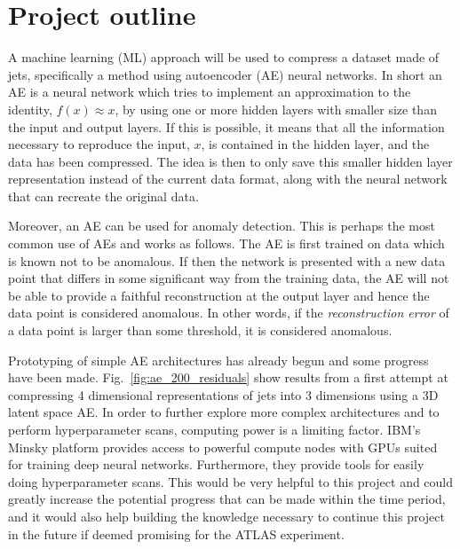 \documentclass[11pt]{article}
\begin{document}
\section{Project outline}

A machine learning (ML) approach will be used to compress a dataset made of jets, specifically a method using autoencoder (AE) neural networks. In short an AE is a neural network which tries to implement an approximation to the identity, $f(x) \approx x$, by using one or more hidden layers with smaller size than the input and output layers. If this is possible, it means that all the information necessary to reproduce the input, $x$, is contained in the hidden layer, and the data has been compressed. The idea is then to only save this smaller hidden layer representation instead of the current data format, along with the neural network that can recreate the original data. 

Moreover, an AE can be used for anomaly detection. This is perhaps the most common use of AEs and works as follows. The AE is first trained on data which is known not to be anomalous. If then the network is presented with a new data point that differs in some significant way from the training data, the AE will not be able to provide a faithful reconstruction at the output layer and hence the data point is considered anomalous. In other words, if the \emph{reconstruction error} of a data point is larger than some threshold, it is considered anomalous.

Prototyping of simple AE architectures has already begun and some progress have been made. Fig.~\ref{fig:ae_200_residuals} show results from a first attempt at compressing 4 dimensional representations of jets into 3 dimensions using a 3D latent space AE. In order to further explore more complex architectures and to perform hyperparameter scans, computing power is a limiting factor. IBM's Minsky platform provides access to powerful compute nodes with GPUs suited for training deep neural networks. Furthermore, they provide tools for easily doing hyperparameter scans. This would be very helpful to this project and could greatly increase the potential progress that can be made within the time period, and it would also help building the knowledge necessary to continue this project in the future if deemed promising for the ATLAS experiment.

\end{document}
